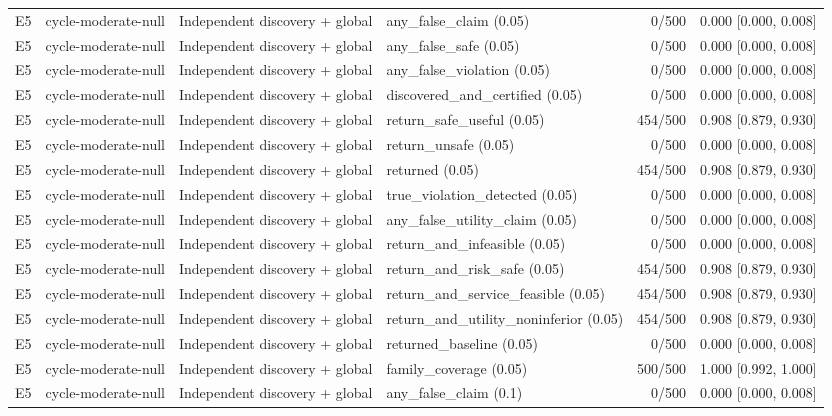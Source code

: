 \begin{longtable}{p{.04\linewidth}p{.18\linewidth}p{.19\linewidth}p{.16\linewidth}r p{.21\linewidth}}
E5 & cycle-moderate-null & Independent discovery + global & any\_false\_claim (0.05) & 0/500 & 0.000 [0.000, 0.008]\\
E5 & cycle-moderate-null & Independent discovery + global & any\_false\_safe (0.05) & 0/500 & 0.000 [0.000, 0.008]\\
E5 & cycle-moderate-null & Independent discovery + global & any\_false\_violation (0.05) & 0/500 & 0.000 [0.000, 0.008]\\
E5 & cycle-moderate-null & Independent discovery + global & discovered\_and\_certified (0.05) & 0/500 & 0.000 [0.000, 0.008]\\
E5 & cycle-moderate-null & Independent discovery + global & return\_safe\_useful (0.05) & 454/500 & 0.908 [0.879, 0.930]\\
E5 & cycle-moderate-null & Independent discovery + global & return\_unsafe (0.05) & 0/500 & 0.000 [0.000, 0.008]\\
E5 & cycle-moderate-null & Independent discovery + global & returned (0.05) & 454/500 & 0.908 [0.879, 0.930]\\
E5 & cycle-moderate-null & Independent discovery + global & true\_violation\_detected (0.05) & 0/500 & 0.000 [0.000, 0.008]\\
E5 & cycle-moderate-null & Independent discovery + global & any\_false\_utility\_claim (0.05) & 0/500 & 0.000 [0.000, 0.008]\\
E5 & cycle-moderate-null & Independent discovery + global & return\_and\_infeasible (0.05) & 0/500 & 0.000 [0.000, 0.008]\\
E5 & cycle-moderate-null & Independent discovery + global & return\_and\_risk\_safe (0.05) & 454/500 & 0.908 [0.879, 0.930]\\
E5 & cycle-moderate-null & Independent discovery + global & return\_and\_service\_feasible (0.05) & 454/500 & 0.908 [0.879, 0.930]\\
E5 & cycle-moderate-null & Independent discovery + global & return\_and\_utility\_noninferior (0.05) & 454/500 & 0.908 [0.879, 0.930]\\
E5 & cycle-moderate-null & Independent discovery + global & returned\_baseline (0.05) & 0/500 & 0.000 [0.000, 0.008]\\
E5 & cycle-moderate-null & Independent discovery + global & family\_coverage (0.05) & 500/500 & 1.000 [0.992, 1.000]\\
E5 & cycle-moderate-null & Independent discovery + global & any\_false\_claim (0.1) & 0/500 & 0.000 [0.000, 0.008]\\

\end{longtable}
